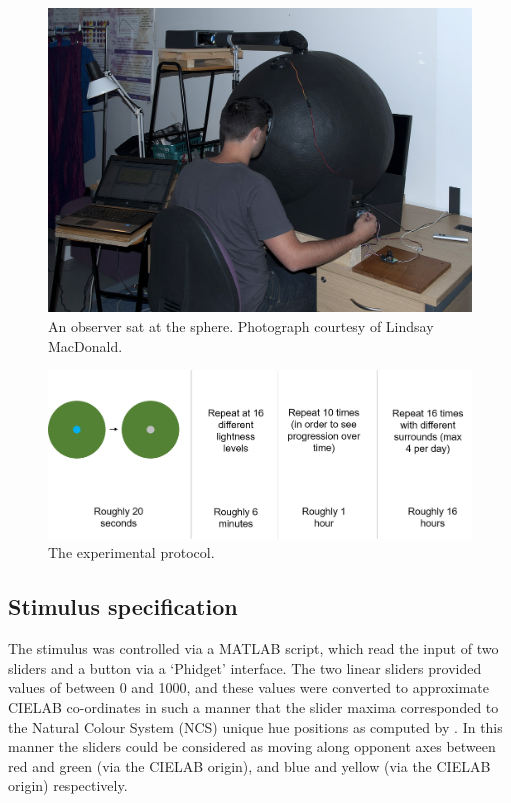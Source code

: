 \begin{figure}[htbp]
\includegraphics[max width=\textwidth]{figs/LargeSphere/Alejandro.jpg}
\caption{An observer sat at the sphere. Photograph courtesy of Lindsay MacDonald.}
\label{fig:Alejandro}
\end{figure}

\begin{figure}[htbp]
\includegraphics[max width=\textwidth]{figs/LargeSphere/ExperimentalPro.png}
\caption{The experimental protocol.}
\label{fig:ExperimentalPro}
\end{figure}

\subsection{Stimulus specification}
\label{sec:LSstim}

The stimulus was controlled via a MATLAB script, which read the input of two sliders and a button via a `Phidget' interface. The two linear sliders provided values of between 0 and 1000, and these values were converted to approximate CIELAB co-ordinates in such a manner that the slider maxima corresponded to the Natural Colour System (NCS) unique hue positions as computed by \citet{derefeldt_transformation_1986}. In this manner the sliders could be considered as moving along opponent axes between red and green (via the CIELAB origin), and blue and yellow (via the CIELAB origin) respectively. 

